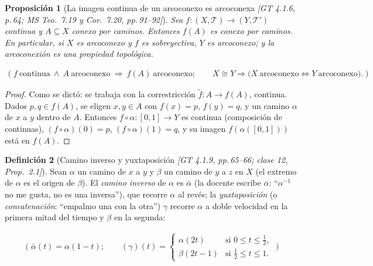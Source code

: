 \documentclass[11pt,a4paper]{article}
\newcommand{\lgc}[1]{\par\vspace{-3pt}\begin{gather*}\big(\;#1\;\big)\end{gather*}\vspace{-6pt}}
\newcommand{\figtit}[1]{\par\vspace{2pt}{\footnotesize\itshape #1}\par}
\theoremstyle{definition}
\newtheorem{definicion}{Definición}[section]
\theoremstyle{plain}
\newtheorem{proposicion}[definicion]{Proposición}
\newcommand{\fnt}[1]{{\normalfont\small\itshape\color{gray!150!black}[#1]}}
\newcommand{\tp}{\mathcal{T}}
\begin{document}
\begin{figure}[ht]
\centering
{}
\figtit{Figura 20. El seno del topólogo: la curva oscila infinitas veces al acercarse al eje $y$. El segmento rojo está en su clausura (por eso el conjunto es conexo), pero ningún camino llega a él desde la curva.}
\end{figure}

\begin{proposicion}[La imagen continua de un arcoconexo es arcoconexa \fnt{GT 4.1.6, p.\,64; MS Teo.\ 7.19 y Cor.\ 7.20, pp.\,91--92}]\label{cc:imarco}
Sea $f:(X,\tp)\to(Y,\tp')$ continua y $A\subseteq X$ conexo por caminos. Entonces $f(A)$ es conexo por caminos. En particular, si $X$ es arcoconexo y $f$ es sobreyectiva, $Y$ es arcoconexo; y la arcoconexión es una propiedad topológica.
\lgc{f\ \text{continua}\ \wedge\ A\ \text{arcoconexo}\ \Rightarrow\ f(A)\ \text{arcoconexo};\qquad X\cong Y\Rightarrow\big(X\ \text{arcoconexo}\iff Y\ \text{arcoconexo}\big).}
\end{proposicion}

\begin{proof}
Como se dictó: se trabaja con la correstricción $\tilde f:A\to f(A)$, continua. Dados $p,q\in f(A)$, se eligen $x,y\in A$ con $f(x)=p$, $f(y)=q$, y un camino $\alpha$ de $x$ a $y$ dentro de $A$. Entonces $f\circ\alpha:[0,1]\to Y$ es continua (composición de continuas), $(f\circ\alpha)(0)=p$, $(f\circ\alpha)(1)=q$, y su imagen $f(\alpha([0,1]))$ está en $f(A)$.
\end{proof}

\begin{definicion}[Camino inverso y yuxtaposición \fnt{GT 4.1.9, pp.\,65--66; clase 12, Prop.\ 2.1}]\label{cc:yuxta}
Sean $\alpha$ un camino de $x$ a $y$ y $\beta$ un camino de $y$ a $z$ en $X$ (el extremo de $\alpha$ es el origen de $\beta$). El \emph{camino inverso} de $\alpha$ es $\bar\alpha$ (la docente escribe $\bar\alpha$: ``$\alpha^{-1}$ no me gusta, no es una inversa''), que recorre $\alpha$ al revés; la \emph{yuxtaposición} (o \emph{concatenación}: ``empalmo una con la otra'') $\gamma$ recorre $\alpha$ a doble velocidad en la primera mitad del tiempo y $\beta$ en la segunda:
\lgc{\bar\alpha(t)=\alpha(1-t);\qquad (\gamma)(t)=\begin{cases}\alpha(2t) & \text{si } 0\le t\le\frac12,\\ \beta(2t-1) & \text{si } \frac12\le t\le 1.\end{cases}}
\end{definicion}
\end{document}
